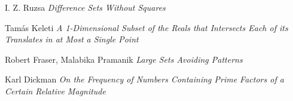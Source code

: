 \documentclass{report}
\theoremstyle{plain}
\theoremstyle{plain}
\begin{document}
\begin{thebibliography}{9}

I. Z. Ruzsa
\textit{Difference Sets Without Squares}

Tam\'{a}s Keleti
\textit{A 1-Dimensional Subset of the Reals that Intersects Each of its Translates in at Most a Single Point}

Robert Fraser, Malabika Pramanik
\textit{Large Sets Avoiding Patterns}

Karl Dickman
\textit{On the Frequency of Numbers Containing Prime Factors of a Certain Relative Magnitude}

\end{thebibliography}
\end{document}
